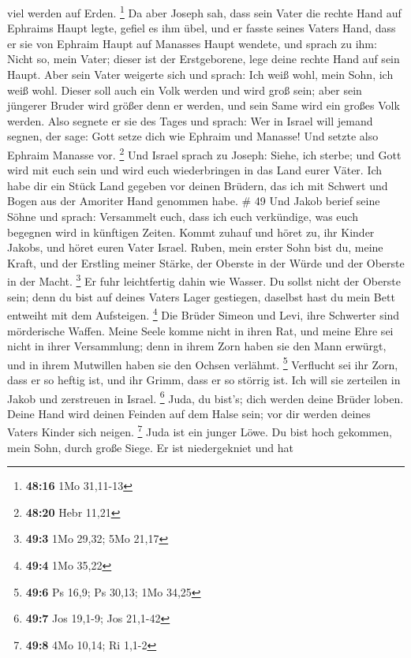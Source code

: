 viel werden auf Erden. \footnote{\textbf{48:16} 1Mo 31,11-13}
 Da aber Joseph sah, dass sein Vater die rechte Hand auf
Ephraims Haupt legte, gefiel es ihm übel, und er fasste seines Vaters
Hand, dass er sie von Ephraim Haupt auf Manasses Haupt wendete,
 und sprach zu ihm: Nicht so, mein Vater; dieser ist der
Erstgeborene, lege deine rechte Hand auf sein Haupt.  Aber
sein Vater weigerte sich und sprach: Ich weiß wohl, mein Sohn, ich weiß
wohl. Dieser soll auch ein Volk werden und wird groß sein; aber sein
jüngerer Bruder wird größer denn er werden, und sein Same wird ein
großes Volk werden.  Also segnete er sie des Tages und
sprach: Wer in Israel will jemand segnen, der sage: Gott setze dich wie
Ephraim und Manasse! Und setzte also Ephraim Manasse vor. \footnote{\textbf{48:20}
  Hebr 11,21}  Und Israel sprach zu Joseph: Siehe, ich
sterbe; und Gott wird mit euch sein und wird euch wiederbringen in das
Land eurer Väter.  Ich habe dir ein Stück Land gegeben vor
deinen Brüdern, das ich mit Schwert und Bogen aus der Amoriter Hand
genommen habe. \# 49  Und Jakob berief seine Söhne und
sprach: Versammelt euch, dass ich euch verkündige, was euch begegnen
wird in künftigen Zeiten.  Kommt zuhauf und höret zu, ihr
Kinder Jakobs, und höret euren Vater Israel.  Ruben, mein
erster Sohn bist du, meine Kraft, und der Erstling meiner Stärke, der
Oberste in der Würde und der Oberste in der Macht. \footnote{\textbf{49:3}
  1Mo 29,32; 5Mo 21,17}  Er fuhr leichtfertig dahin wie
Wasser. Du sollst nicht der Oberste sein; denn du bist auf deines Vaters
Lager gestiegen, daselbst hast du mein Bett entweiht mit dem Aufsteigen.
\footnote{\textbf{49:4} 1Mo 35,22}  Die Brüder Simeon und
Levi, ihre Schwerter sind mörderische Waffen.  Meine Seele
komme nicht in ihren Rat, und meine Ehre sei nicht in ihrer Versammlung;
denn in ihrem Zorn haben sie den Mann erwürgt, und in ihrem Mutwillen
haben sie den Ochsen verlähmt. \footnote{\textbf{49:6} Ps 16,9; Ps
  30,13; 1Mo 34,25}  Verflucht sei ihr Zorn, dass er so
heftig ist, und ihr Grimm, dass er so störrig ist. Ich will sie
zerteilen in Jakob und zerstreuen in Israel. \footnote{\textbf{49:7} Jos
  19,1-9; Jos 21,1-42}  Juda, du bist's; dich werden deine
Brüder loben. Deine Hand wird deinen Feinden auf dem Halse sein; vor dir
werden deines Vaters Kinder sich neigen. \footnote{\textbf{49:8} 4Mo
  10,14; Ri 1,1-2}  Juda ist ein junger Löwe. Du bist hoch
gekommen, mein Sohn, durch große Siege. Er ist niedergekniet und hat
